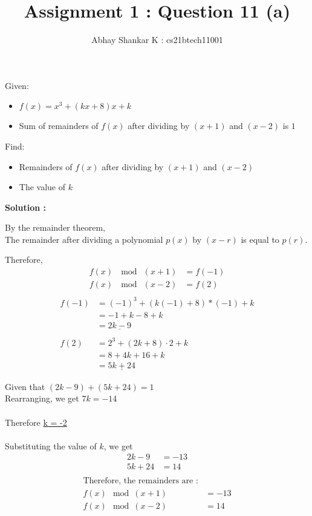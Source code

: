 \documentclass[11pt, oneside, twocolumn]{amsart}   	%
\title{Assignment 1 : Question 11 (a)}
\author{Abhay Shankar K : cs21btech11001}
\begin{document}
\maketitle
Given:
\begin{itemize}
	\item $f(x) = x^3 + (kx + 8)x + k$ 
	\item Sum of remainders of $f(x)$ after dividing by $(x + 1)$ and $(x - 2)$ is $1$
\end{itemize}
Find:
\begin{itemize}
	\item Remainders of $f(x)$ after dividing by $(x + 1)$ and $(x - 2)$
	\item The value of $k$
\end{itemize}

\textbf{Solution :}

By the remainder theorem, \\
	\quad The remainder after dividing a polynomial $p(x)$ by $(x - r)$ is equal to $p(r)$.

	 Therefore,
	\begin{align*}
  		f(x)\ \mod\ (x + 1) &= f(-1) \\
  		f(x)\ \mod\ (x - 2) &= f(2) \\
	\end{align*}
	\begin{align*}
 		f(-1) &= (-1)^3 + (k(-1) + 8)*(-1) + k \\
		 &= -1 + k - 8 + k \\
		 &= \underline{2k - 9}  \\
		\\
		f(2) &= 2^3 + (2k + 8) \cdot 2 + k \\
		  &= 8 + 4k + 16 + k \\
		 &= \underline{5k + 24}
	\end{align*}
		  
Given that $(2k - 9) + (5k + 24) = 1$
	\\	
Rearranging, we get $7k = -14$ \\
		\\
Therefore \underline{k = -2}\\
		\\
Substituting the value of $k$, we get
	\begin{align*}
		2k - 9 &= -13 \\
		5k + 24 &= 14 \\
\end{align*}
\begin{align*}
\text{Therefore, the remainders are :}
 \\
	f(x) \mod (x + 1) &= -13 \\
	f(x) \mod (x - 2) &= 14 \\
		\end{align*}
\\
\end{document}
